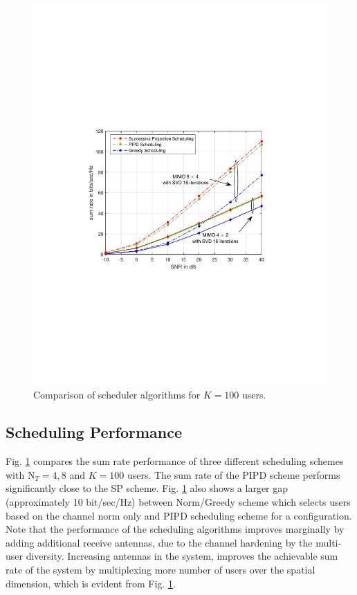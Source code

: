 \documentclass[conference,letterpaper]{./../../IEEE/IEEEtran}
\begin{document}
\begin{figure}
	\centering
	\includegraphics[trim=1.5in 3.5in 1.5in 3.5in,width=\columnwidth]{sra_100}
	\caption{Comparison of scheduler algorithms for $K = 100$ users.}
	\label{kuva:performance_plot}
	\vspace{-0.15in}
\end{figure}

\subsection{Scheduling Performance}
Fig. \ref{kuva:performance_plot} compares the sum rate performance of three different scheduling schemes with $\textrm{N}_T = 4,8$ and $K = 100$ users. The sum rate of the PIPD scheme performs significantly close to the SP scheme. Fig. \ref{kuva:performance_plot} also shows a larger gap (approximately 10 bit/sec/Hz) between Norm/Greedy scheme which selects users based on the channel norm only and PIPD scheduling scheme for a  configuration. Note that the performance of the scheduling algorithms improves marginally by adding additional receive antennas, due to the channel hardening by the multi-user diversity. Increasing  antennas in the system, improves the achievable sum rate of the system by multiplexing more number of users over the spatial dimension, which is evident from Fig. \ref{kuva:performance_plot}.
\end{document}

